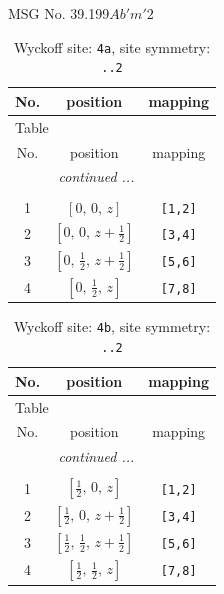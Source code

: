 \documentclass[fleqn,8pt]{jsarticle}
\begin{document}
\setcounter{MaxMatrixCols}{32}

\renewcommand{\tablename}{Table~}
\renewcommand{\figurename}{Figure~}
\begin{center}
\LARGE
MSG No. 39.199\quad$Ab'm'2$
\end{center}
\renewcommand{\arraystretch}{1.2}
\begin{longtable}{ccc}
\caption{Wyckoff site: {\tt 4a}, site symmetry: {\tt ..2}}
 \\
 \hline \hline
No. & position & mapping \\ \hline \endfirsthead

\multicolumn{2}{l}{\tablename\ \thetable{}} \\
 \hline \hline
No. & position & mapping \\ \hline \endhead

 \hline \hline
\multicolumn{2}{r}{\footnotesize\it continued ...} \\ \endfoot

 \hline \hline
\multicolumn{2}{r}{} \\ \endlastfoot

1 & $\left[ 0,\, 0,\, z \right]$ & {\tt [1,2]} \\ \hline
2 & $\left[ 0,\, 0,\, z + \frac{1}{2} \right]$ & {\tt [3,4]} \\ \hline
3 & $\left[ 0,\, \frac{1}{2},\, z + \frac{1}{2} \right]$ & {\tt [5,6]} \\ \hline
4 & $\left[ 0,\, \frac{1}{2},\, z \right]$ & {\tt [7,8]} \\
\end{longtable}
\renewcommand{\arraystretch}{1.2}
\begin{longtable}{ccc}
\caption{Wyckoff site: {\tt 4b}, site symmetry: {\tt ..2}}
 \\
 \hline \hline
No. & position & mapping \\ \hline \endfirsthead

\multicolumn{2}{l}{\tablename\ \thetable{}} \\
 \hline \hline
No. & position & mapping \\ \hline \endhead

 \hline \hline
\multicolumn{2}{r}{\footnotesize\it continued ...} \\ \endfoot

 \hline \hline
\multicolumn{2}{r}{} \\ \endlastfoot

1 & $\left[ \frac{1}{2},\, 0,\, z \right]$ & {\tt [1,2]} \\ \hline
2 & $\left[ \frac{1}{2},\, 0,\, z + \frac{1}{2} \right]$ & {\tt [3,4]} \\ \hline
3 & $\left[ \frac{1}{2},\, \frac{1}{2},\, z + \frac{1}{2} \right]$ & {\tt [5,6]} \\ \hline
4 & $\left[ \frac{1}{2},\, \frac{1}{2},\, z \right]$ & {\tt [7,8]} \\
\end{longtable}
\end{document}
